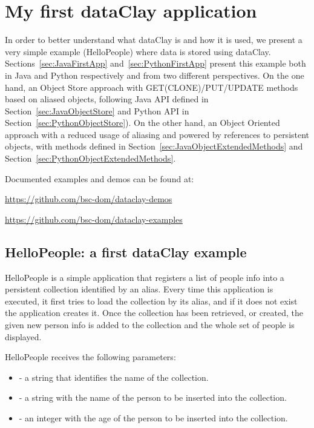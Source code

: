 
\chapter{My first dataClay application}
\label{sec:MyFirstApplication}

In order to better understand what dataClay is and how it is used, we present a very simple example (HelloPeople) where data is stored using dataClay. Sections~\ref{sec:JavaFirstApp} and~\ref{sec:PythonFirstApp} present this example both in Java and Python respectively and from two different perspectives. On the one hand, an Object Store approach with GET(CLONE)/PUT/UPDATE methods based on aliased objects, following Java API defined in Section~\ref{sec:JavaObjectStore} and Python API in Section~\ref{sec:PythonObjectStore}). On the other hand, an Object Oriented approach with a reduced usage of aliasing and powered by references to persistent objects, with methods defined in Section~\ref{sec:JavaObjectExtendedMethods} and Section~\ref{sec:PythonObjectExtendedMethods}.

Documented examples and demos can be found at: 

\href {https://github.com/bsc-dom/dataclay-demos} {https://github.com/bsc-dom/dataclay-demos}

\href {https://github.com/bsc-dom/dataclay-examples} {https://github.com/bsc-dom/dataclay-examples}

\section{HelloPeople: a first dataClay example}
\label{sec:HelloPeople}

HelloPeople is a simple application that registers a list of people info into a persistent collection identified by an alias. Every time this application is executed, it first tries to load the collection by its alias, and if it does not exist the application creates it. Once the collection has been retrieved, or created, the given new person info is added to the collection and the whole set of people is displayed.

HelloPeople receives the following parameters:

\begin{itemize}
    \item - a string that identifies the name of the collection.
    \item - a string with the name of the person to be inserted into the collection.
    \item - an integer with the age of the person to be inserted into the collection.
\end{itemize}

